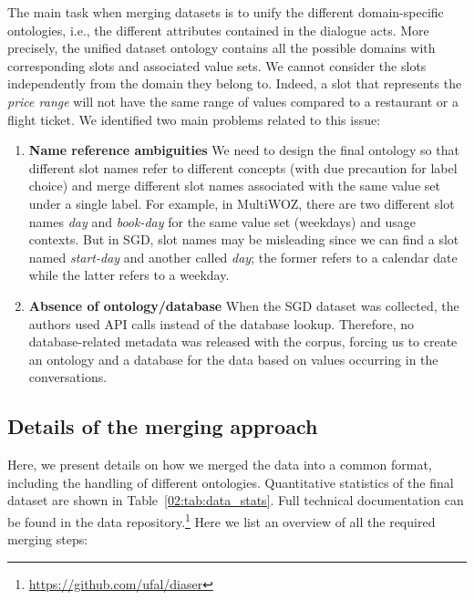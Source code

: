 The main task when merging datasets is to unify the different domain-specific ontologies, i.e., the different attributes contained in the dialogue acts.
More precisely, the unified dataset ontology contains all the possible domains with corresponding slots and associated value sets.
We cannot consider the slots independently from the domain they belong to.
Indeed, a slot that represents the \textit{price range} will not have the same range of values compared to a restaurant or a flight ticket.
We identified two main problems related to this issue:
\begin{enumerate}
    \item \textbf{Name reference ambiguities}
    We need to design the final ontology so that different slot names refer to different concepts (with due precaution for label choice) and merge different slot names associated with the same value set under a single label.
    For example, in MultiWOZ, there are two different slot names \textit{day} and \textit{book-day} for the same value set (weekdays) and usage contexts.
    But in SGD, slot names may be misleading since we can find a slot named \textit{start-day} and another called \textit{day}; the former refers to a calendar date while the latter refers to a weekday.
    
    \item \textbf{Absence of ontology/database} When the SGD dataset was collected, the authors used API calls instead of the database lookup.
    Therefore, no database-related metadata was released with the corpus, forcing us to create an ontology and a database for the data based on values occurring in the conversations.
\end{enumerate}

\subsection{Details of the merging approach}
Here, we present details on how we merged the data into a common format, including the handling of different ontologies.
Quantitative statistics of the final dataset are shown in Table~\ref{02:tab:data_stats}.
Full technical documentation can be found in the data repository.\footnote{\url{https://github.com/ufal/diaser}}
Here we list an overview of all the required merging steps:

